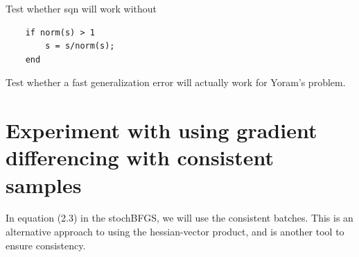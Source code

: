 \documentclass[12pt]{article}
\begin{document}
Test whether sqn will work without 
\begin{verbatim}
    if norm(s) > 1
        s = s/norm(s);
    end
\end{verbatim}

Test whether a fast generalization error will actually work for Yoram's problem.

\section{Experiment with using gradient differencing with consistent samples}

In equation (2.3) in the stochBFGS, we will use the consistent batches. This is an alternative approach to using the hessian-vector product, and is another tool to ensure consistency. 
\end{document}
